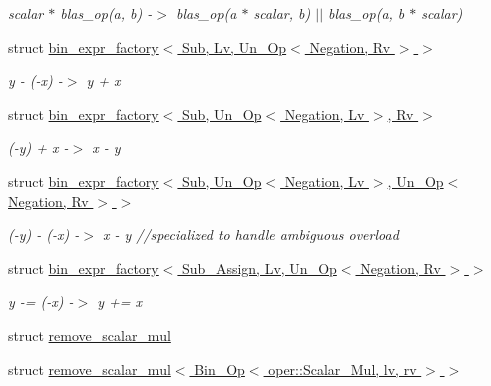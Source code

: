\begin{DoxyCompactItemize}
\begin{DoxyCompactList}\small\item\em scalar $\ast$ blas\+\_\+op(a, b) -\/$>$ blas\+\_\+op(a $\ast$ scalar, b) $\vert$$\vert$ blas\+\_\+op(a, b $\ast$ scalar) \end{DoxyCompactList}\item 
struct \hyperlink{structbc_1_1tensors_1_1exprs_1_1detail_1_1bin__expr__factory_3_01Sub_00_01Lv_00_01Un__Op_3_01Negation_00_01Rv_01_4_01_4}{bin\+\_\+expr\+\_\+factory$<$ Sub, Lv, Un\+\_\+\+Op$<$ Negation, Rv $>$ $>$}
\begin{DoxyCompactList}\small\item\em y -\/ (-\/x) -\/$>$ y + x \end{DoxyCompactList}\item 
struct \hyperlink{structbc_1_1tensors_1_1exprs_1_1detail_1_1bin__expr__factory_3_01Sub_00_01Un__Op_3_01Negation_00_01Lv_01_4_00_01Rv_01_4}{bin\+\_\+expr\+\_\+factory$<$ Sub, Un\+\_\+\+Op$<$ Negation, Lv $>$, Rv $>$}
\begin{DoxyCompactList}\small\item\em (-\/y) + x -\/$>$ x -\/ y \end{DoxyCompactList}\item 
struct \hyperlink{structbc_1_1tensors_1_1exprs_1_1detail_1_1bin__expr__factory_3_01Sub_00_01Un__Op_3_01Negation_004b0c12d341e754dc0e6fb842519b678e}{bin\+\_\+expr\+\_\+factory$<$ Sub, Un\+\_\+\+Op$<$ Negation, Lv $>$, Un\+\_\+\+Op$<$ Negation, Rv $>$ $>$}
\begin{DoxyCompactList}\small\item\em (-\/y) -\/ (-\/x) -\/$>$ x -\/ y //specialized to handle ambiguous overload \end{DoxyCompactList}\item 
struct \hyperlink{structbc_1_1tensors_1_1exprs_1_1detail_1_1bin__expr__factory_3_01Sub__Assign_00_01Lv_00_01Un__Op_3_01Negation_00_01Rv_01_4_01_4}{bin\+\_\+expr\+\_\+factory$<$ Sub\+\_\+\+Assign, Lv, Un\+\_\+\+Op$<$ Negation, Rv $>$ $>$}
\begin{DoxyCompactList}\small\item\em y -\/= (-\/x) -\/$>$ y += x \end{DoxyCompactList}\item 
struct \hyperlink{structbc_1_1tensors_1_1exprs_1_1detail_1_1remove__scalar__mul}{remove\+\_\+scalar\+\_\+mul}
\item 
struct \hyperlink{structbc_1_1tensors_1_1exprs_1_1detail_1_1remove__scalar__mul_3_01Bin__Op_3_01oper_1_1Scalar__Mul_00_01lv_00_01rv_01_4_01_4}{remove\+\_\+scalar\+\_\+mul$<$ Bin\+\_\+\+Op$<$ oper\+::\+Scalar\+\_\+\+Mul, lv, rv $>$ $>$}

\end{DoxyCompactItemize}
